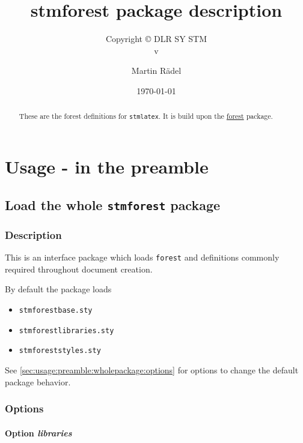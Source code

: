 \documentclass[%
  type=article,%
  layout=koma,%
  date=true,%
  hyperref=true,%
  listings=true,%
  forest=false,%
]{stmtext}
\author{Martin R\"{a}del}
\title{stmforest package description}
\subtitle{Copyright \copyright{} \the\year{} DLR SY STM\\v\formatdate[versiondatestyle]{\DTMToday}}
\date{\today}
\begin{document}
\maketitle

\begin{abstract}
These are the forest definitions for \texttt{stmlatex}. It is build upon the \href{https://ctan.org/pkg/forest}{forest} package.
\end{abstract}

\tableofcontents

\section{Usage - in the preamble}

\subsection{Load the whole \protect\texttt{stmforest} package}

\subsubsection{Description}

This is an interface package which loads \texttt{forest} and definitions commonly required throughout document creation.

By default the package loads

\begin{itemize}[noitemsep]
  \item \verb+stmforestbase.sty+
  \item \verb+stmforestlibraries.sty+
  \item \verb+stmforeststyles.sty+
\end{itemize}

See \autoref{sec:usage:preamble:wholepackage:options} for options to change the default package behavior.

\subsubsection{Options}
\label{sec:usage:preamble:wholepackage:options}

\paragraph{Option \protect\textit{libraries}} 
\label{sec:usage:preamble:wholepackage:options:libraries}
\end{document}
